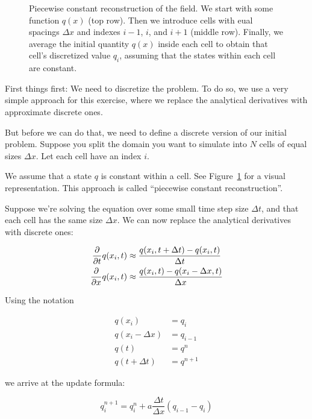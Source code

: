\begin{figure}[htbp]
	\caption{
		Piecewise constant reconstruction of the field. We start with some function
		$q(x)$ (top row). Then we introduce cells with eual spacings $\Delta x$ and
		indexes $i - 1$, $i$, and $i + 1$ (middle row). Finally, we average the
		initial quantity $q(x)$ inside each cell to obtain that cell's discretized
		value $q_i$, assuming that the states within each cell are constant.
	}
	\label{fig:pwconst}
\end{figure}


First things first: We need to discretize the problem. To do so, we use a very
simple approach for this exercise, where we replace the analytical derivatives
with approximate discrete ones.

But before we can do that, we need to define a discrete version of our initial
problem. Suppose you split the domain you want to simulate into $N$ cells of 
equal sizes $\Delta x$. Let each cell have an index $i$. 

We assume that a state $q$ is constant within a cell. See Figure~\ref{fig:pwconst}
for a visual representation. This approach is called ``piecewise constant reconstruction''.

Suppose we're solving the equation over some small time step size $\Delta t$, and
that each cell has the same size $\Delta x$. We can now replace the analytical 
derivatives with discrete ones:

\begin{align}
	\frac{\partial}{\partial t}{q(x_i, t)} &\approx \frac{q(x_i, t + \Delta t) - q(x_i, t)}{\Delta t} \\
	\frac{\partial}{\partial x}{q(x_i, t)} &\approx \frac{q(x_i, t) - q(x_i - \Delta x, t)}{\Delta x} \label{eq:approx-gradient}
\end{align}

Using the notation

\begin{align}
	q(x_i) &= q_i \\
	q(x_i - \Delta x) &= q_{i-1} \\
	q(t) &= q^n \\
	q(t + \Delta t) &= q^{n + 1}
\end{align}

we arrive at the update formula:

\begin{equation}
\boxed{
	q_i^{n+1} = q_i^{n} +  a \frac{\Delta t}{\Delta x} \left( q_{i-1} - q_{i} \right) 
}
\label{eq:advection-first-order}
\end{equation}



